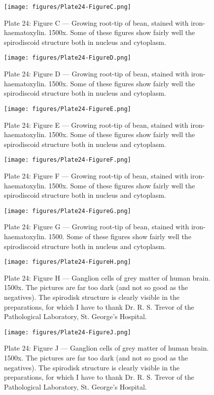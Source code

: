 \documentclass[a4paper, 12pt, oneside]{article}
\begin{document}
\clearpage
\begin{figure}[b]
\centering
\texttt{[image: figures/Plate24-FigureC.png]}
\caption{\small Plate 24: Figure C --- Growing root-tip of bean, stained with iron-haematoxylin. 1500x. Some of these figures show fairly well the spirodiscoid structure both in nucleus and cytoplasm.}
\end{figure}
\clearpage
\begin{figure}[b]
\centering
\texttt{[image: figures/Plate24-FigureD.png]}
\caption{\small Plate 24: Figure D --- Growing root-tip of bean, stained with iron-haematoxylin. 1500x. Some of these figures show fairly well the spirodiscoid structure both in nucleus and cytoplasm.}
\end{figure}
\clearpage
\begin{figure}[b]
\centering
\texttt{[image: figures/Plate24-FigureE.png]}
\caption{\small Plate 24: Figure E --- Growing root-tip of bean, stained with iron-haematoxylin. 1500x. Some of these figures show fairly well the spirodiscoid structure both in nucleus and cytoplasm.}
\end{figure}
\clearpage
\begin{figure}[b]
\centering
\texttt{[image: figures/Plate24-FigureF.png]}
\caption{\small Plate 24: Figure F --- Growing root-tip of bean, stained with iron-haematoxylin. 1500x. Some of these figures show fairly well the spirodiscoid structure both in nucleus and cytoplasm.}
\end{figure}
\clearpage
\begin{figure}[b]
\centering
\texttt{[image: figures/Plate24-FigureG.png]}
\caption{\small Plate 24: Figure G --- Growing root-tip of bean, stained with iron-haematoxylin. 1500. Some of these figures show fairly well the spirodiscoid structure both in nucleus and cytoplasm.}
\end{figure}
\clearpage
\begin{figure}[b]
\centering
\texttt{[image: figures/Plate24-FigureH.png]}
\caption{\small Plate 24: Figure H --- Ganglion cells of grey matter of human brain. 1500x. The pictures are far too dark (and not so good as the negatives). The spirodisk structure is clearly visible in the preparations, for which I have to thank Dr. R. S. Trevor of the Pathological Laboratory, St. George's Hospital.}
\end{figure}
\clearpage
\begin{figure}[H]
\centering
\texttt{[image: figures/Plate24-FigureJ.png]}
\caption{\small Plate 24: Figure J --- Ganglion cells of grey matter of human brain. 1500x. The pictures are far too dark (and not so good as the negatives). The spirodisk structure is clearly visible in the preparations, for which I have to thank Dr. R. S. Trevor of the Pathological Laboratory, St. George's Hospital.}
\end{figure}
\end{document}
